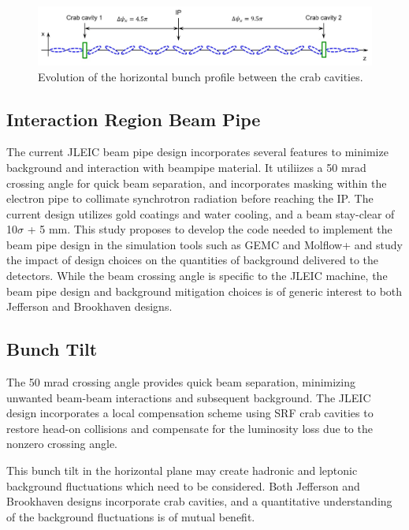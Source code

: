 \begin{figure}[t]
	\centering
	\includegraphics[width=.75\textwidth]{../../img/crab_bunch_profile.jpg}
	\caption{Evolution of the horizontal bunch profile between the crab cavities.}
	\label{fig:jleic4}
\end{figure}

\subsection{Interaction Region Beam Pipe}
The current JLEIC beam pipe design incorporates several features to minimize background and interaction with beampipe material.  It utiliizes a 50 mrad crossing angle for quick beam separation, and incorporates masking within the electron pipe to collimate synchrotron radiation before reaching the IP.  The current design utilizes gold coatings and water cooling, and a beam stay-clear of 10$\sigma$ + 5 mm. This study proposes to develop the code needed to implement the beam pipe design in the simulation tools such as GEMC and Molflow+ and study the impact of design choices on the quantities of background delivered to the detectors.  While the beam crossing angle is specific to the JLEIC machine, the beam pipe design and background mitigation choices is of generic interest to both Jefferson and Brookhaven designs.


\subsection{Bunch Tilt}
The 50 mrad crossing angle provides quick beam separation, minimizing unwanted beam-beam interactions and subsequent background.  The JLEIC design incorporates a local compensation scheme using SRF crab cavities to restore head-on collisions and compensate for the luminosity loss due to the nonzero crossing angle.  

This bunch tilt in the horizontal plane may create hadronic and leptonic background fluctuations which need to be considered.  Both Jefferson and Brookhaven designs incorporate crab cavities, and a quantitative understanding of the background fluctuations is of mutual benefit. 






